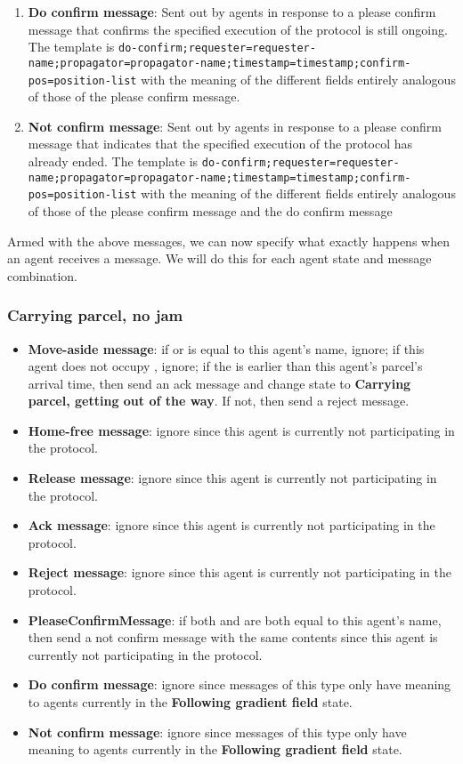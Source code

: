 \begin{enumerate}
\begin{enumerate}
        \end{enumerate}
    \item \textbf{Do confirm message}: Sent out by agents in response to a please confirm message that confirms the specified execution of the protocol is still ongoing. The template is \texttt{do-confirm;requester=requester-name;propagator=propagator-name;timestamp=timestamp;confirm-pos=position-list} with the meaning of the different fields entirely analogous of those of the please confirm message.
    \item \textbf{Not confirm message}: Sent out by agents in response to a please confirm message that indicates that the specified execution of the protocol has already ended. The template is \texttt{do-confirm;requester=requester-name;propagator=propagator-name;timestamp=timestamp;confirm-pos=position-list} with the meaning of the different fields entirely analogous of those of the please confirm message and the do confirm message
\end{enumerate}

Armed with the above messages, we can now specify what exactly happens when an agent receives a message. We will do this for each agent state and message combination.

\subsubsection*{Carrying parcel, no jam}
\begin{itemize}
    \item \textbf{Move-aside message}: if  or  is equal to this agent's name, ignore; if this agent does not occupy , ignore; if the  is earlier than this agent's parcel's arrival time, then send an ack message and change state to \textbf{Carrying parcel, getting out of the way}. If not, then send a reject message.
    \item \textbf{Home-free message}: ignore since this agent is currently not participating in the protocol.
    \item \textbf{Release message}: ignore since this agent is currently not participating in the protocol.
    \item \textbf{Ack message}: ignore since this agent is currently not participating in the protocol.
    \item \textbf{Reject message}: ignore since this agent is currently not participating in the protocol.
    \item \textbf{PleaseConfirmMessage}: if both  and  are both equal to this agent's name, then send a not confirm message with the same contents since this agent is currently not participating in the protocol.
    \item \textbf{Do confirm message}: ignore since messages of this type only have meaning to agents currently in the \textbf{Following gradient field} state.
    \item \textbf{Not confirm message}: ignore since messages of this type only have meaning to agents currently in the \textbf{Following gradient field} state.
\end{itemize}

